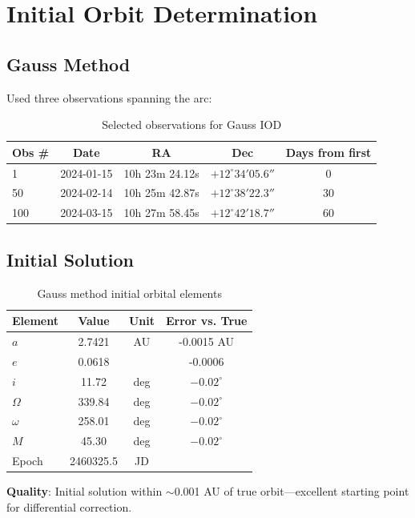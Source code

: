 \section{Initial Orbit Determination}

\subsection{Gauss Method}

Used three observations spanning the arc:

\begin{table}[htbp]
\centering
\caption{Selected observations for Gauss IOD}
\begin{tabular}{lcccc}
\hline
\textbf{Obs \#} & \textbf{Date} & \textbf{RA} & \textbf{Dec} & \textbf{Days from first} \\
\hline
1 & 2024-01-15 & 10h 23m 24.12s & $+12^\circ 34' 05.6''$ & 0 \\
50 & 2024-02-14 & 10h 25m 42.87s & $+12^\circ 38' 22.3''$ & 30 \\
100 & 2024-03-15 & 10h 27m 58.45s & $+12^\circ 42' 18.7''$ & 60 \\
\hline
\end{tabular}
\end{table}

\subsection{Initial Solution}

\begin{table}[htbp]
\centering
\caption{Gauss method initial orbital elements}
\begin{tabular}{lccc}
\hline
\textbf{Element} & \textbf{Value} & \textbf{Unit} & \textbf{Error vs. True} \\
\hline
$a$ & 2.7421 & AU & -0.0015 AU \\
$e$ & 0.0618 & & -0.0006 \\
$i$ & 11.72 & deg & $-0.02^\circ$ \\
$\Omega$ & 339.84 & deg & $-0.02^\circ$ \\
$\omega$ & 258.01 & deg & $-0.02^\circ$ \\
$M$ & 45.30 & deg & $-0.02^\circ$ \\
Epoch & 2460325.5 & JD & \\
\hline
\end{tabular}
\end{table}

\textbf{Quality}: Initial solution within $\sim$0.001 AU of true orbit—excellent starting point for differential correction.

